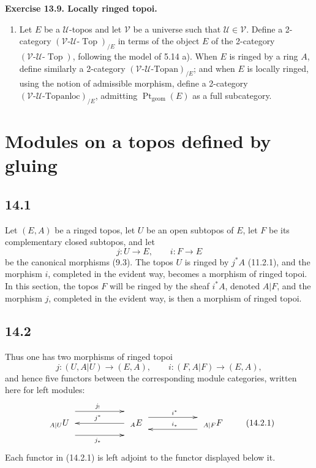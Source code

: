 \documentclass[11pt]{article}
\newcommand{\U}{\mathcal{U}}
\newcommand{\V}{\mathcal{V}}
\newcommand{\Top}{\operatorname{Top}}
\newcommand{\Spec}{\operatorname{Spec}}
\newcommand{\Ppoint}{\operatorname{Pt}}
\newcommand{\Pptgeom}{\operatorname{Pt}_{\mathrm{geom}}}
\newcommand{\ie}{i.e.}
\newenvironment{remarktext}[1]{\par\medskip\noindent\textbf{#1.}\ }{\par\medskip}
\begin{document}
\begin{remarktext}{Exercise 13.9. Locally ringed topoi}
\begin{enumerate}[label=\alph*)]
A \emph{geometric point of a locally ringed topos} $E$ means any admissible morphism into $E$ from the locally ringed topos defined by a ringed space of the form $\Spec(k)$, where $k$ is an \emph{algebraically closed} field. Define the \emph{category of geometric points of} $E$ (understood: corresponding to fields $k\in\U$), denoted $\Pptgeom(E)$, and a canonical functor
\[
\Pptgeom(E)\longrightarrow \Ppoint(E).
\]
Show that this functor is faithful if and only if $E$ has no point, \ie\ if and only if $\Ppoint(E)$ is the empty category.
\item Let $E$ be a $\U$-topos and let $\V$ be a universe such that $\U\in\V$. Define a 2-category $(\V\text{-}\U\text{-}\Top)_{/E}$ in terms of the object $E$ of the 2-category $(\V\text{-}\U\text{-}\Top)$, following the model of 5.14 a). When $E$ is ringed by a ring $A$, define similarly a 2-category $(\V\text{-}\U\text{-}\mathrm{Topan})_{/E}$; and when $E$ is locally ringed, using the notion of admissible morphism, define a 2-category $(\V\text{-}\U\text{-}\mathrm{Topanloc})_{/E}$, admitting $\Pptgeom(E)$ as a full subcategory.
\end{enumerate}
\end{remarktext}

\section{Modules on a topos defined by gluing}

\subsection*{14.1}
Let $(E,A)$ be a ringed topos, let $U$ be an open subtopos of $E$, let $F$ be its complementary closed subtopos, and let
\[
j:U\to E,\qquad i:F\to E
\]
be the canonical morphisms (9.3). The topos $U$ is ringed by $j^*A$ (11.2.1), and the morphism $i$, completed in the evident way, becomes a morphism of ringed topoi. In this section, the topos $F$ will be ringed by the sheaf $i^*A$, denoted $A|F$, and the morphism $j$, completed in the evident way, is then a morphism of ringed topoi.

\subsection*{14.2}
Thus one has two morphisms of ringed topoi
\[
j:(U,A|U)\longrightarrow(E,A),\qquad i:(F,A|F)\longrightarrow(E,A),
\]
and hence five functors between the corresponding module categories, written here for left modules:
\[
\xymatrix@C=2cm@R=1.3cm@M=.25cm{
{}_{A|U}U \ar@<14pt>[r]^{j_!}\ar@<-14pt>[r]_{j_*}&
{}_{A}E \ar[l]_{j^*}\ar@<7pt>[r]^{i^*}&
{}_{A|F}F\ar@<7pt>[l]_{i_*}
}
\tag{14.2.1}
\]
Each functor in (14.2.1) is left adjoint to the functor displayed below it.
\end{document}
